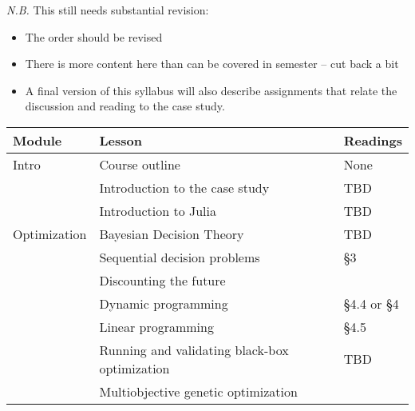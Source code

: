 \documentclass[nobib]{tufte-handout}
\begin{document}
\emph{N.B.} This still needs substantial revision:
\begin{itemize}
	\item The order should be revised
	\item There is more content here than can be covered in semester -- cut back a bit
	\item A final version of this syllabus will also describe assignments that relate the discussion and reading to the case study.
\end{itemize}
\begin{fullwidth}
	\begin{tabular}{R{1in} L{3in} L{2.5in}}
		\toprule
		Module           & Lesson                                        & Readings                                                        \\
		\midrule
		Intro            & Course outline                                & None                                                            \\
		                 & Introduction to the case study                & TBD                                                             \\
		                 & Introduction to Julia                         & TBD                                                             \\
		Optimization     & Bayesian Decision Theory                      & TBD                                                             \\
		                 & Sequential decision problems                  & \citet{sutton:2018} \S 3                                        \\
		                 & Discounting the future                        & \citet{arrow_discount:2013}                                     \\
		                 & Dynamic programming                           & \citet{loucks_planning:2017} \S 4.4 or \citet{sutton:2018} \S 4 \\
		                 & Linear programming                            & \citet{loucks_planning:2017} \S 4.5                             \\
		                 & Running and validating black-box optimization & TBD                                                             \\
		                 & Multiobjective genetic optimization           & \citet{hadka_borg:2012}                                         \\

\end{tabular}
\end{fullwidth}
\end{document}
